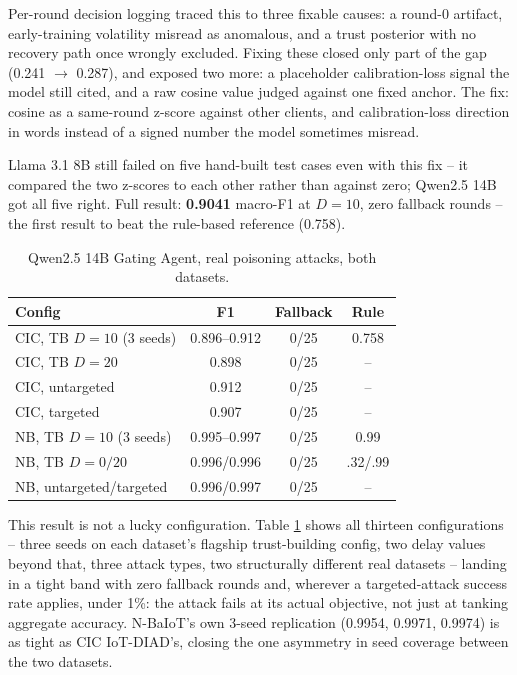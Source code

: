 \documentclass[conference]{IEEEtran}
\begin{document}
Per-round decision logging traced this to three fixable causes: a round-0 artifact, early-training volatility misread as anomalous, and a trust posterior with no recovery path once wrongly excluded. Fixing these closed only part of the gap (0.241 $\to$ 0.287), and exposed two more: a placeholder calibration-loss signal the model still cited, and a raw cosine value judged against one fixed anchor. The fix: cosine as a same-round z-score against other clients, and calibration-loss direction in words instead of a signed number the model sometimes misread.

Llama 3.1 8B still failed on five hand-built test cases even with this fix -- it compared the two z-scores to each other rather than against zero; Qwen2.5 14B got all five right. Full result: \textbf{0.9041} macro-F1 at $D{=}10$, zero fallback rounds -- the first result to beat the rule-based reference (0.758).

\begin{table}[t]
\centering
\footnotesize
\caption{Qwen2.5 14B Gating Agent, real poisoning attacks, both datasets.}
\label{tab:headline}
\begin{tabular}{@{}lccc@{}}
\toprule
\textbf{Config} & \textbf{F1} & \textbf{Fallback} & \textbf{Rule} \\
\midrule
CIC, TB $D{=}10$ (3 seeds) & 0.896--0.912 & 0/25 & 0.758 \\
CIC, TB $D{=}20$ & 0.898 & 0/25 & -- \\
CIC, untargeted & 0.912 & 0/25 & -- \\
CIC, targeted & 0.907 & 0/25 & -- \\
NB, TB $D{=}10$ (3 seeds) & 0.995--0.997 & 0/25 & 0.99 \\
NB, TB $D{=}0/20$ & 0.996/0.996 & 0/25 & .32/.99 \\
NB, untargeted/targeted & 0.996/0.997 & 0/25 & -- \\
\bottomrule
\end{tabular}
\end{table}

This result is not a lucky configuration. Table \ref{tab:headline} shows all thirteen configurations -- three seeds on each dataset's flagship trust-building config, two delay values beyond that, three attack types, two structurally different real datasets -- landing in a tight band with zero fallback rounds and, wherever a targeted-attack success rate applies, under 1\%: the attack fails at its actual objective, not just at tanking aggregate accuracy. N-BaIoT's own 3-seed replication (0.9954, 0.9971, 0.9974) is as tight as CIC IoT-DIAD's, closing the one asymmetry in seed coverage between the two datasets.
\end{document}
